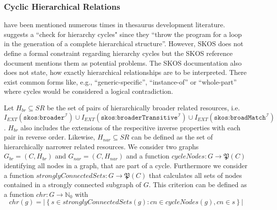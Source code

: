 \subsubsection{Cyclic Hierarchical Relations} have been mentioned numerous times in thesaurus development literature. \cite{Soergel2002} suggests a ``check for hierarchy cycles" since they ``throw the program for a loop in the generation of a complete hierarchical structure''. However, SKOS does not define a formal constraint regarding hierarchy cycles but the SKOS reference document mentions them as potential problems. The SKOS documentation also does not state, how exactly hierarchical relationships are to be interpreted. There exist common forms like, e.g., ``generic-specific'', ``instance-of'' or ``whole-part'' \cite{Hedden2010,Harpring2010,Aitchison2000} where cycles would be considered a logical contradiction.
 
\begin{definition}
Let \(H_{br} \subseteq SR\) be the set of pairs of hierarchically broader related resources, i.e. \(I_{EXT}(\texttt{skos:broader}^\mathcal{I}) \cup I_{EXT}(\texttt{skos:broaderTransitive}^\mathcal{I}) \cup I_{EXT}(\texttt{skos:broadMatch}^\mathcal{I})\). \(H_{br}\) also includes the extensions of the respecitive inverse properties with each pair in reverse order. Likewise, \(H_{nar} \subseteq SR\) can be defined as the set of hierarchically narrower related resources. We consider two graphs \(G_{br} = (C,H_{br})\) and \(G_{nar}=(C,H_{nar})\) and a function \(cycleNodes:G \rightarrow \mathfrak{P}(C)\) identifying all nodes in a graph, that are part of a cycle. Furthermore we consider a function \(stronglyConnectedSets: G \rightarrow \mathfrak{P}(C)\) that calculates all sets of nodes contained in a strongly connected subgraph of $G$. This criterion can be defined as a function \(chr:G \rightarrow \mathbb{N}_{0}\) with \[chr(g)=\left|\left\{s \in stronglyConnectedSets(g) : cn \in cycleNodes(g), cn \in s\right\}\right|\]
\end{definition}

